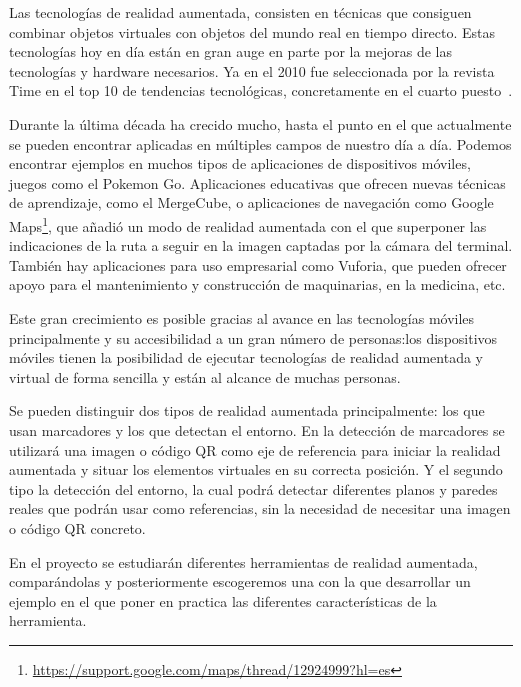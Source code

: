 
Las tecnologías de realidad aumentada, consisten en técnicas que consiguen combinar objetos virtuales con objetos del mundo real en tiempo directo. 
Estas tecnologías hoy en día están en gran auge en parte por la mejoras de las tecnologías y hardware necesarios. Ya en el 2010 fue seleccionada por la revista Time en el top 10 de tendencias tecnológicas, concretamente en el cuarto puesto~\cite{fletcher_2010}. 

Durante la última década ha crecido mucho, hasta el punto en el que actualmente se pueden encontrar aplicadas en múltiples campos de nuestro día a día. Podemos encontrar ejemplos en muchos tipos de aplicaciones de dispositivos móviles, juegos como el Pokemon Go. Aplicaciones educativas que ofrecen nuevas técnicas de aprendizaje, como el MergeCube, o aplicaciones de navegación como Google Maps\footnote{\url{https://support.google.com/maps/thread/12924999?hl=es}}, que añadió un modo de realidad aumentada con el que superponer las indicaciones de la ruta a seguir en la imagen captadas por la cámara del terminal. También hay aplicaciones para uso empresarial como Vuforia, que pueden ofrecer apoyo para el mantenimiento y construcción de maquinarias, en la medicina, etc.


Este gran crecimiento es posible gracias al avance en las tecnologías móviles principalmente y su accesibilidad a un gran número de personas:los dispositivos móviles tienen la posibilidad de ejecutar tecnologías de realidad aumentada y virtual de forma sencilla y están al alcance de muchas personas.

Se pueden distinguir dos tipos de realidad aumentada principalmente: los que usan marcadores y los que detectan el entorno. En la detección de marcadores se utilizará una imagen o código QR como eje de referencia para iniciar la realidad aumentada y situar los elementos virtuales en su correcta posición. 
Y el segundo tipo la detección del entorno, la cual podrá detectar diferentes planos y paredes reales que podrán usar como referencias, sin la necesidad de necesitar una imagen o código QR concreto.


En el proyecto se estudiarán diferentes herramientas de realidad aumentada, comparándolas y posteriormente escogeremos una con la que desarrollar un ejemplo en el que poner en practica las diferentes características de la herramienta.


